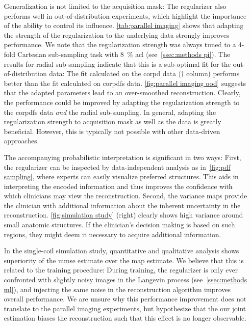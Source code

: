\documentclass[twocolumn]{article}
\begin{document}
Generalization is not limited to the acquisition mask:
The regularizer also performs well in out-of-distribution experiments, which highlight the importance of the ability to control its influence.
\cref{tab:parallel imaging} shows that adapting the strength of the regularization to the underlying data strongly improves performance.
We note that the regularization strength was always tuned to a \num{4}-fold Cartesian sub-sampling task with \qty{8}{\percent} \gls{acl} (see~\cref{ssec:methods pi}).
The results for radial sub-sampling indicate that this is a sub-optimal fit for the out-of-distribution data:
The fit calculated on the \gls{corpd} data (\( \dagger \) column) performs better than the fit calculated on \gls{corpdfs} data.
\cref{fig:parallel imaging ood}  suggests that the adapted parameters lead to an over-smoothed reconstruction.
Clearly, the performance could be improved by adapting the regularization strength to the \gls{corpdfs} data \emph{and} the radial sub-sampling.
In general, adapting the regularization strength to acquisition mask as well as the data is greatly beneficial.
However, this is typically not possible with other data-driven approaches.

The accompanying probabilistic interpretation is significant in two ways:
First, the regularizer can be inspected by data-independent analysis as in~\cref{fig:pdf sampling}, where experts can easily visualize preferred structures.
This aids in interpreting the encoded information and thus improves the confidence with which clinicians may view the reconstruction.
Second, the variance maps provide the clinician with additional information about the inherent uncertainty in the reconstruction.
\cref{fig:simulation study} (right) clearly shows high variance around small anatomic structures.
If the clinician's decision making is based on such regions, they might deem it necessary to acquire additional information.

In the single-coil simulation study, quantitative and qualitative analysis shows superiority of the \gls{mmse} estimate over the \gls{map} estimate.
We believe that this is related to the training procedure:
During training, the regularizer is only ever confronted with slightly noisy images in the Langevin process (see~\cref{ssec:methods ml}), and injecting the same noise in the reconstruction algorithm improves overall performance.
We are unsure why this performance improvement does not translate to the parallel imaging experiments, but hypothesize that the our joint estimation biases the reconstruction such that this effect is no longer observable.
\end{document}
